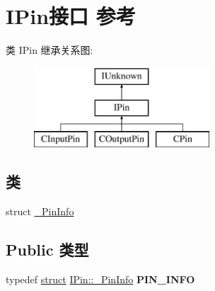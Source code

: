 \hypertarget{interface_i_pin}{}\section{I\+Pin接口 参考}
\label{interface_i_pin}
类 I\+Pin 继承关系图\+:\begin{figure}[H]
\begin{center}
\leavevmode
\includegraphics[height=3.000000cm]{interface_i_pin}
\end{center}
\end{figure}
\subsection*{类}
\begin{DoxyCompactItemize}
\item 
struct \hyperlink{struct_i_pin_1_1___pin_info}{\+\_\+\+Pin\+Info}
\end{DoxyCompactItemize}
\subsection*{Public 类型}
\begin{DoxyCompactItemize}
\item 
\mbox{\label{interface_i_pin_afc796473dbd9fc526a1ad498786971d1}} 
typedef \hyperlink{interfacestruct}{struct} \hyperlink{struct_i_pin_1_1___pin_info}{I\+Pin\+::\+\_\+\+Pin\+Info} {\bfseries P\+I\+N\+\_\+\+I\+N\+FO}
\end{DoxyCompactItemize}
